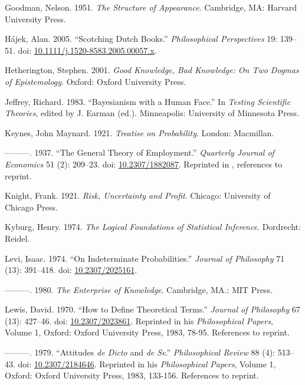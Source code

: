 \documentclass[
  10pt,
  letterpaper,
  DIV=11,
  numbers=noendperiod,
  twoside]{scrartcl}
\newlength{\cslhangindent}
\newenvironment{CSLReferences}[2] %
 {\begin{list}{}{%
  \setlength{\itemindent}{0pt}
  \setlength{\leftmargin}{0pt}
  \setlength{\parsep}{0pt}
  \ifodd #1
   \setlength{\leftmargin}{\cslhangindent}
   \setlength{\itemindent}{-1\cslhangindent}
  \fi
  \setlength{\itemsep}{#2\baselineskip}}}
 {\end{list}}
\begin{document}
\begin{CSLReferences}{1}{0}
Goodman, Nelson. 1951. \emph{The Structure of Appearance}. Cambridge,
MA: Harvard University Press.

Hájek, Alan. 2005. {``Scotching Dutch Books.''} \emph{Philosophical
Perspectives} 19: 139--51. doi:
\href{https://doi.org/10.1111/j.1520-8583.2005.00057.x}{10.1111/j.1520-8583.2005.00057.x}.

Hetherington, Stephen. 2001. \emph{Good Knowledge, Bad Knowledge: On Two
Dogmas of Epistemology}. Oxford: Oxford University Press.

Jeffrey, Richard. 1983. {``Bayesianism with a Human Face.''} In
\emph{Testing Scientific Theories}, edited by J. Earman (ed.).
Minneapolis: University of Minnesota Press.

Keynes, John Maynard. 1921. \emph{Treatise on Probability}. London:
Macmillan.

---------. 1937. {``The General Theory of Employment.''} \emph{Quarterly
Journal of Economics} 51 (2): 209--23. doi:
\href{https://doi.org/10.2307/1882087}{10.2307/1882087}. Reprinted in
\cite[XIV 109-123]{KeynesCW}, references to reprint.

Knight, Frank. 1921. \emph{Risk, Uncertainty and Profit}. Chicago:
University of Chicago Press.

Kyburg, Henry. 1974. \emph{The Logical Foundations of Statistical
Inference}. Dordrecht: Reidel.

Levi, Isaac. 1974. {``On Indeterminate Probabilities.''} \emph{Journal
of Philosophy} 71 (13): 391--418. doi:
\href{https://doi.org/10.2307/2025161}{10.2307/2025161}.

---------. 1980. \emph{The Enterprise of Knowledge}. Cambridge, MA.: MIT
Press.

Lewis, David. 1970. {``How to Define Theoretical Terms.''} \emph{Journal
of Philosophy} 67 (13): 427--46. doi:
\href{https://doi.org/10.2307/2023861}{10.2307/2023861}. Reprinted in
his \emph{Philosophical Papers}, Volume 1, Oxford: Oxford University
Press, 1983, 78-95. References to reprint.

---------. 1979. {``Attitudes \emph{de Dicto} and \emph{de Se}.''}
\emph{Philosophical Review} 88 (4): 513--43. doi:
\href{https://doi.org/10.2307/2184646}{10.2307/2184646}. Reprinted in
his \emph{Philosophical Papers}, Volume 1, Oxford: Oxford University
Press, 1983, 133-156. References to reprint.


\end{CSLReferences}
\end{document}
